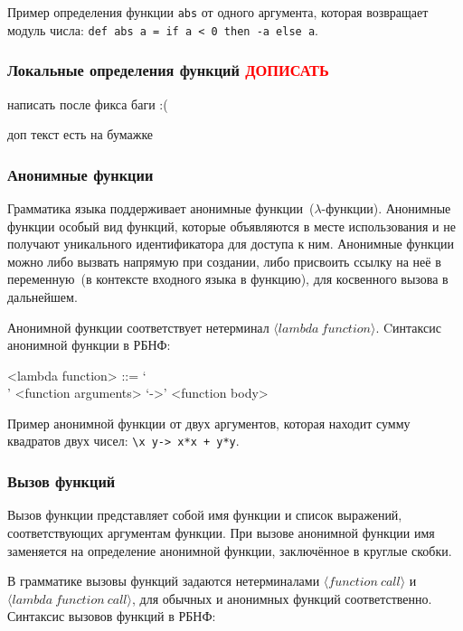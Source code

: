 \documentclass[12pt,a4paper,oneside]{extarticle}
\begin{document}
            Пример определения функции \lstinline$abs$ от одного аргумента, которая возвращает модуль числа: \lstinline$def abs a = if a < 0 then -a else a$.
        \subsubsection{Локальные определения функций \textcolor{red}{ДОПИСАТЬ}}
            написать после фикса баги :( 

            доп текст есть на бумажке


        \subsubsection{Анонимные функции}
            Грамматика языка поддерживает анонимные функции~($\lambda$-функции). Анонимные функции особый вид функций, которые объявляются в месте использования и не получают уникального идентификатора для доступа к ним. Анонимные функции можно либо вызвать напрямую при создании, либо присвоить ссылку на неё в переменную~(в контексте входного языка в функцию), для косвенного вызова в дальнейшем.

            Анонимной функции соответствует нетерминал $\langle lambda~function \rangle$. Cинтаксис анонимной функции в РБНФ:
            \begin{grammar}
                <lambda function> ::= `\\' <function arguments> `->' <function body>
            \end{grammar}

            Пример анонимной функции от двух аргументов, которая находит сумму квадратов двух чисел: \lstinline$\x y-> x*x + y*y$.

        \subsubsection{Вызов функций}
            Вызов функции представляет собой имя функции и список выражений, соответствующих аргументам функции.
            При вызове анонимной функции имя заменяется на определение анонимной функции, заключённое в круглые скобки.

            В грамматике вызовы функций задаются нетерминалами $\langle function~call \rangle$ и $\langle lambda~function~call \rangle$, для обычных и анонимных функций соответственно. Синтаксис вызовов функций в РБНФ:
\end{document}
